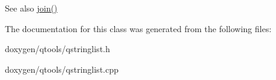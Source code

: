 \begin{DoxySeeAlso}{See also}
\mbox{\hyperlink{class_q_string_list_a4d14f4987725926a5c812991a27d0f91}{join()}} 
\end{DoxySeeAlso}


The documentation for this class was generated from the following files\+:\begin{DoxyCompactItemize}
\item 
doxygen/qtools/qstringlist.\+h\item 
doxygen/qtools/qstringlist.\+cpp\end{DoxyCompactItemize}
